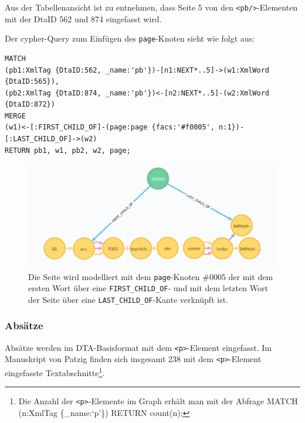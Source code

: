 Aus der Tabellenansicht ist zu entnehmen, dass Seite 5 von den
\texttt{\textless{}pb/\textgreater{}}-Elementen mit der DtaID 562 und
874 eingefasst wird.

Der cypher-Query zum Einfügen des \texttt{page}-Knoten sieht wie folgt
aus:

\begin{verbatim}
MATCH
(pb1:XmlTag {DtaID:562, _name:'pb'})-[n1:NEXT*..5]->(w1:XmlWord {DtaID:565}),
(pb2:XmlTag {DtaID:874, _name:'pb'})<-[n2:NEXT*..5]-(w2:XmlWord {DtaID:872})
MERGE
(w1)<-[:FIRST_CHILD_OF]-(page:page {facs:'#f0005', n:1})-[:LAST_CHILD_OF]->(w2)
RETURN pb1, w1, pb2, w2, page;
\end{verbatim}

\begin{figure}
\centering
\includegraphics{Bilder/TEI2Graph/page-f0005.png}
\caption[Die Seite wird modelliert mit dem \texttt{page}-Knoten \#0005
der mit dem ersten Wort über eine \texttt{FIRST\_CHILD\_OF}- und mit dem
letzten Wort der Seite über eine \texttt{LAST\_CHILD\_OF}-Kante
verknüpft ist.]{Die Seite wird modelliert mit dem \texttt{page}-Knoten
\#0005 der mit dem ersten Wort über eine \texttt{FIRST\_CHILD\_OF}- und
mit dem letzten Wort der Seite über eine \texttt{LAST\_CHILD\_OF}-Kante
verknüpft ist.\footnotemark{}}
\end{figure}

\hypertarget{absuxe4tze}{%
\subsubsection{Absätze}\label{absuxe4tze}}

Absätze werden im DTA-Basisformat mit dem
\texttt{\textless{}p\textgreater{}}-Element eingefasst. Im Manuskript
von Patzig finden sich insgesamt 238 mit dem
\texttt{\textless{}p\textgreater{}}-Element eingefasste
Textabschnitte\footnote{Die Anzahl der
  \texttt{\textless{}p\textgreater{}}-Elemente im Graph erhält man mit
  der Abfrage MATCH (n:XmlTag \{\_name:`p'\}) RETURN count(n);}.

